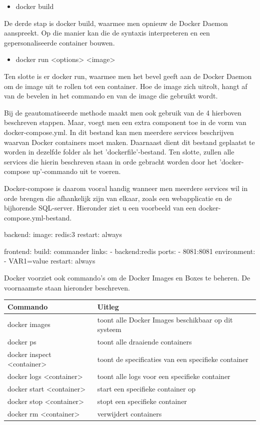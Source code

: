 \begin{itemize}[noitemsep]
	\item docker build
\end{itemize}
De derde stap is docker build, waarmee men opnieuw de Docker Daemon aanspreekt. Op die manier kan die de syntaxis interpreteren en een gepersonaliseerde container bouwen.

\begin{itemize}[noitemsep]
	\item docker run <options> <image>
\end{itemize}
Ten slotte is er docker run, waarmee men het bevel geeft aan de Docker Daemon om de image uit te rollen tot een container. Hoe de image zich uitrolt, hangt af van de bevelen in het commando en van de image die gebruikt wordt. 

Bij de geautomatiseerde methode maakt men ook gebruik van de 4 hierboven beschreven stappen. Maar, voegt men een extra component toe in de vorm van docker-compose.yml. In dit bestand kan men meerdere services beschrijven waarvan Docker containers moet maken. Daarnaast dient dit bestand geplaatst te worden in dezelfde folder als het 'dockerfile'-bestand. Ten slotte, zullen alle services die hierin beschreven staan in orde gebracht worden door het 'docker-compose up'-commando uit te voeren.

Docker-compose is daarom vooral handig wanneer men meerdere services wil in orde brengen die afhankelijk zijn van elkaar, zoals een webapplicatie en de bijhorende SQL-server. Hieronder ziet u een voorbeeld van een docker-compose.yml-bestand.

backend: 
	image: redis:3 
	restart: always

frontend: 
	build: commander 
	links: 
		- backend:redis  
	ports: 
		- 8081:8081 
	environment: 
		- VAR1=value 
	restart: always

Docker voorziet ook commando's om de Docker Images en Boxes te beheren. De voornaamste staan hieronder beschreven.

\begin{tabular}{ll}
	\hline
	Commando & Uitleg \\
	\hline
	docker images & toont alle Docker Images beschikbaar op dit systeem \\
	docker ps & toont alle draaiende containers \\
	docker inspect <container> & toont de specificaties van een specifieke container \\
	docker logs <container> & toont alle logs voor een specifieke container \\
	docker start <container> & start een specifieke container op \\
	docker stop <container> & stopt een specifieke container \\
	docker rm <container> & verwijdert containers \\
	\hline
\end{tabular}

